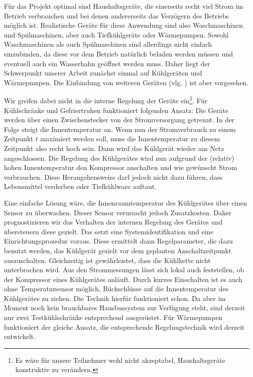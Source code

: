 \documentclass[12pt,BCOR=8.5mm]{scrartcl}
\begin{document}
Für das Projekt optimal sind Haushaltsgeräte, die einerseits recht viel
Strom im Betrieb verbrauchen und bei denen andererseits das Verzögern
des Betriebs möglich ist. Realistische Geräte für diese Anwendung sind
also Waschmaschinen und Spülmaschinen, aber auch Tiefkühlgeräte oder
Wärmepumpen. Sowohl Waschmaschinen als auch Spülmaschinen sind
allerdings nicht einfach einzubinden, da diese vor dem Betrieb natürlich
beladen werden müssen und eventuell auch ein Wasserhahn geöffnet werden
muss. Daher liegt der Schwerpunkt unserer Arbeit zunächst einmal auf
Kühlgeräten und Wärmepumpen. Die Einbindung von weiteren Geräten
(vlg. \cite[S. 22]{wiechmann08lastmanagement}) ist aber vorgesehen.

Wir greifen dabei nicht in die interne Regelung der Geräte
ein\footnote{Es wäre für unsere Teilnehmer wohl nicht akzeptabel,
Haushaltsgeräte konstruktiv zu verändern.}. Für
Kühlschränke und Gefriertruhen funktioniert folgenden Ansatz: Die
Geräte werden über einen Zwischenstecker von der Stromversorgung
getrennt. In der Folge steigt die Innentemperatur an. Wenn nun der
Stromverbrauch zu einem Zeitpunkt $t$ maximiert werden soll, muss die
Innentemperatur zu diesem Zeitpunkt also recht hoch sein. Dann wird das
Kühlgerät wieder ans Netz angeschlossen. Die Regelung des Kühlgerätes
wird nun aufgrund der (relativ) hohen Innentemperatur den Kompressor
anschalten und wie gewünscht Strom verbrauchen. Diese Herangehensweise
darf jedoch nicht dazu führen, dass Lebensmittel verderben oder
Tiefkühlware auftaut.

Eine einfache Lösung wäre, die Innenraumtemperatur des Kühlgerätes über
einen Sensor zu überwachen. Dieser Sensor verursacht jedoch
Zusatzkosten. Daher prognostizieren wir das Verhalten der internen
Regelung des Gerätes und übersteuern diese gezielt. Das setzt eine
Systemidentifikation und eine Einrichtungsprozedur voraus. Diese
ermittelt dann Regelparameter, die dazu benutzt werden, das Kühlgerät
gezielt vor dem geplanten Anschaltzeitpunkt auszuschalten. Gleichzeitig
ist gewährleistet, dass die Kühlkette nicht unterbrochen wird. Aus den
Strommessungen lässt sich lokal auch feststellen, ob der Kompressor
eines Kühlgerätes anläuft. Durch kurzes Einschalten ist es auch ohne
Temperatursensor möglich, Rückschlüsse auf die Innentemperatur des
Kühlgerätes zu ziehen. Die Technik hierfür funktioniert schon. Da aber
im Moment noch kein brauchbares Hausbussystem zur Verfügung steht, sind
derzeit nur zwei Testkühlschränke entsprechend ausgerüstet. Für
Wärmepumpen funktioniert der gleiche Ansatz, die entsprechende
Regelungstechnik wird derzeit entwickelt.
\end{document}
